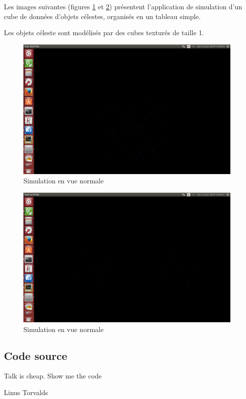 \documentclass[a4paper,french,12pt]{article}
\begin{document}
		Les images suivantes (figures \ref{basic_normal} et \ref{basic_oculus}) présentent l'application de simulation d'un cube de données d'objets célestes, 
		organisés en un tableau simple.
		
		Les objets céleste sont modélisés par des cubes texturés de taille 1.
		
		\begin{figure}
			      \centering
			      \includegraphics[width=1.0\textwidth]{basic_normal.png}
			      \caption{Simulation en vue normale}
			      \label{basic_normal}
		\end{figure}
		
		\begin{figure}
			      \centering
			      \includegraphics[width=1.0\textwidth]{basic_oculus.png}
			      \caption{Simulation en vue normale}
			      \label{basic_oculus}
		\end{figure}
		\FloatBarrier
		
	\newpage	
	\subsection{Code source}
	\epigraph{Talk is cheap. Show me the code}{Linus Torvalds}
	
\end{document}
